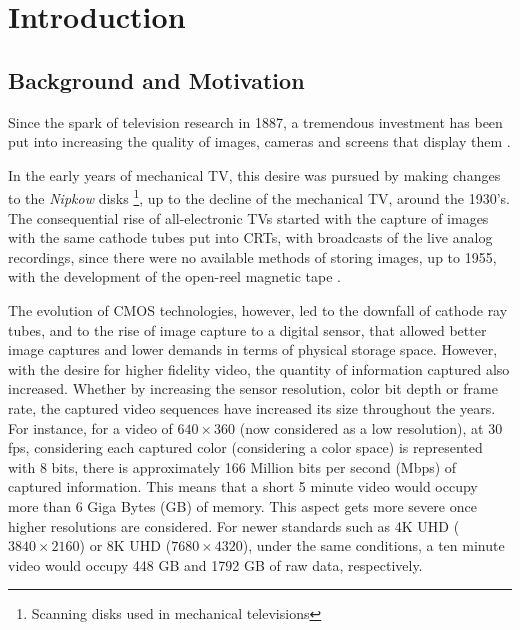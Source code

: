 \cleardoublepage
{}
\chapter{Introduction}

\section{Background and Motivation}


Since the spark of television research in 1887, a tremendous investment has been put into increasing the quality of images, cameras and screens that display them \cite{schubinWhatSparkedVideo2017}.

In the early years of mechanical \gls{TV}, this desire was pursued by making changes to the \textit{Nipkow} disks \footnote{Scanning disks used in mechanical televisions}, up to the decline of the mechanical TV, around the 1930's. The consequential rise of all-electronic TVs started with the capture of images with the same cathode tubes put into \glspl{CRT}, with broadcasts of the live analog recordings, since there were no available methods of storing images, up to 1955, with the development of the open-reel magnetic tape \cite{jacobsBriefHistoryVideo}.

The evolution of \Gls{CMOS} technologies, however, led to the downfall of cathode ray tubes, and to the rise of image capture to a digital sensor, that allowed better image captures and lower demands in terms of physical storage space. However, with the desire for higher fidelity video, the quantity of information captured also increased. Whether by increasing the sensor resolution, color bit depth or frame rate, the captured video sequences have increased its size throughout the years. For instance, for a video of $640 \times 360$ (now considered as a low resolution), at 30 \gls{fps}, considering each captured color (considering a  color space) is represented with 8 bits, there is approximately 166 Million bits per second (Mbps) of captured information. This means that a short 5 minute video would occupy more than 6 Giga Bytes (GB) of memory. This aspect gets more severe once higher resolutions are considered. For newer standards such as 4K \Gls{UHD} ($3840 \times 2160$) or 8K UHD ($ 7680 \times 4320$), under the same conditions, a ten minute video would occupy 448 GB and 1792 GB of raw data, respectively.

